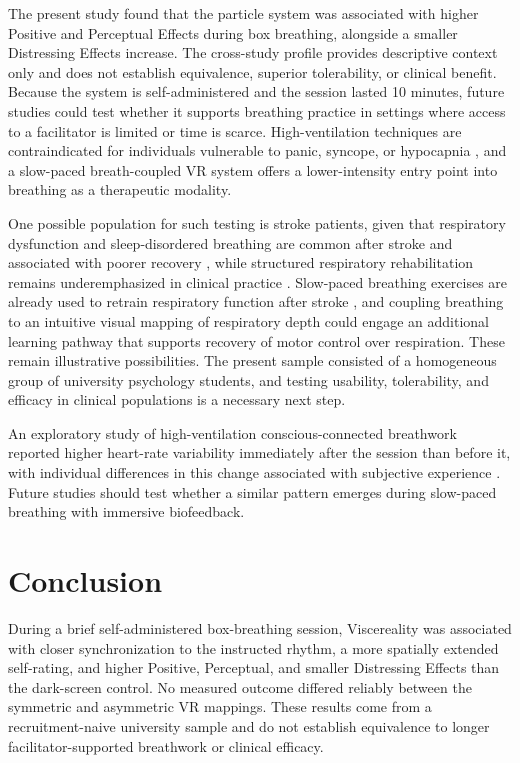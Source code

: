 \documentclass[pdflatex,sn-basic,lineno]{sn-jnl}
\begin{document}
The present study found that the particle system was associated with higher Positive and Perceptual Effects during box breathing, alongside a smaller Distressing Effects increase. The cross-study profile provides descriptive context only and does not establish equivalence, superior tolerability, or clinical benefit. Because the system is self-administered and the session lasted 10 minutes, future studies could test whether it supports breathing practice in settings where access to a facilitator is limited or time is scarce. High-ventilation techniques are contraindicated for individuals vulnerable to panic, syncope, or hypocapnia \citep{fincham2023effect}, and a slow-paced breath-coupled VR system offers a lower-intensity entry point into breathing as a therapeutic modality.

One possible population for such testing is stroke patients, given that respiratory dysfunction and sleep-disordered breathing are common after stroke and associated with poorer recovery \citep{Patrizz2023,Seiler2019}, while structured respiratory rehabilitation remains underemphasized in clinical practice \citep{Menezes2018}. Slow-paced breathing exercises are already used to retrain respiratory function after stroke \citep{Abdullahi2024,Kang2022}, and coupling breathing to an intuitive visual mapping of respiratory depth could engage an additional learning pathway that supports recovery of motor control over respiration. These remain illustrative possibilities. The present sample consisted of a homogeneous group of university psychology students, and testing usability, tolerability, and efficacy in clinical populations is a necessary next step.

An exploratory study of high-ventilation conscious-connected breathwork reported higher heart-rate variability immediately after the session than before it, with individual differences in this change associated with subjective experience \citep{Canello2026HRV}. Future studies should test whether a similar pattern emerges during slow-paced breathing with immersive biofeedback.


\section{Conclusion}
 During a brief self-administered box-breathing session, Viscereality was associated with closer synchronization to the instructed rhythm, a more spatially extended self-rating, and higher Positive, Perceptual, and smaller Distressing Effects than the dark-screen control. No measured outcome differed reliably between the symmetric and asymmetric VR mappings. These results come from a recruitment-naive university sample and do not establish equivalence to longer facilitator-supported breathwork or clinical efficacy.
\end{document}
